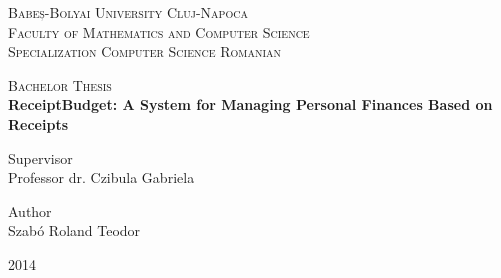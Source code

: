 \begin{titlepage}
    \begin{center}
        \vspace*{1cm}
        
        \Large
        \textsc{Babeș-Bolyai University Cluj-Napoca} \\
		\textsc{Faculty of Mathematics and Computer Science} \\
		\textsc{Specialization Computer Science Romanian}

		\vspace{1.5cm}
        \Huge
        \textsc{Bachelor Thesis} \\[1cm]
        \textbf{ReceiptBudget: A System for Managing Personal Finances Based on Receipts}
\end{center}        

        \vspace{2cm}
		\Large
        \begin{minipage}[t]{0.5\textwidth}
       		Supervisor \\
        	Professor dr. Czibula Gabriela \\
		\end{minipage}
		\begin{minipage}[t]{0.5\textwidth}
			\begin{flushright}
				Author \\
				Szabó Roland Teodor
			\end{flushright}
		\end{minipage}
        \vfill

        \vspace{0.8cm}
\begin{center}
	\Huge
        2014
\end{center}
        
\end{titlepage}